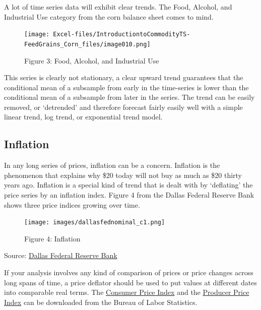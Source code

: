 \documentclass[
  letterpaper,
  DIV=11,
  numbers=noendperiod]{scrreprt}
\begin{document}
A lot of time series data will exhibit clear trends. The Food, Alcohol,
and Industrial Use category from the corn balance sheet comes to mind.

\begin{figure}[H]

{\centering \texttt{[image: Excel-files/IntroductiontoCommodityTS-FeedGrains\_Corn\_files/image010.png]}

}

\caption{Figure 3: Food, Alcohol, and Industrial Use}

\end{figure}%

This series is clearly not stationary, a clear upward trend guarantees
that the conditional mean of a subsample from early in the time-series
is lower than the conditional mean of a subsample from later in the
series. The trend can be easily removed, or `detrended' and therefore
forecast fairly easily well with a simple linear trend, log trend, or
exponential trend model.

\subsection{Inflation}\label{inflation}

In any long series of prices, inflation can be a concern. Inflation is
the phenomenon that explains why \$20 today will not buy as much as \$20
thirty years ago. Inflation is a special kind of trend that is dealt
with by `deflating' the price series by an inflation index. Figure 4
from the Dallas Federal Reserve Bank shows three price indices growing
over time.

\begin{figure}[H]

{\centering \texttt{[image: images/dallasfednominal\_c1.png]}

}

\caption{Figure 4: Inflation}

\end{figure}%

Source:
\href{http://www.dallasfed.org/research/basics/nominal.cfm}{Dallas
Federal Reserve Bank}

If your analysis involves any kind of comparison of prices or price
changes across long spans of time, a price deflator should be used to
put values at different dates into comparable real terms. The
\href{http://www.bls.gov/cpi/data.htm}{Consumer Price Index} and the
\href{http://www.bls.gov/ppi/data.htm}{Producer Price Index} can be
downloaded from the Bureau of Labor Statistics.
\end{document}
